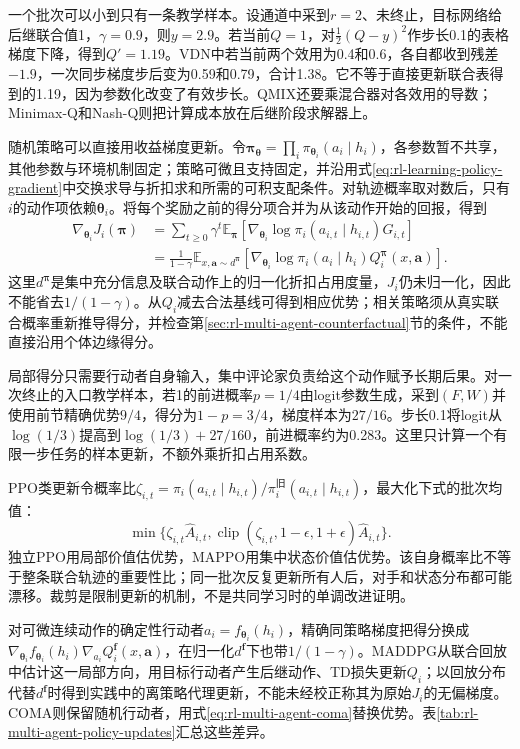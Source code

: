 一个批次可以小到只有一条教学样本。设通道中采到$r=2$、未终止，目标网络给后继联合值1，$\gamma=0.9$，则$y=2.9$。若当前$Q=1$，对$\tfrac12(Q-y)^2$作步长0.1的表格梯度下降，得到$Q'=1.19$。VDN中若当前两个效用为0.4和0.6，各自都收到残差$-1.9$，一次同步梯度步后变为0.59和0.79，合计1.38。它不等于直接更新联合表得到的1.19，因为参数化改变了有效步长。QMIX还要乘混合器对各效用的导数；Minimax-Q和Nash-Q则把计算成本放在后继阶段求解器上。

随机策略可以直接用收益梯度更新。令$\bm\pi_{\bm\theta}=\prod_i\pi_{\bm\theta_i}(a_i\mid h_i)$，各参数暂不共享，其他参数与环境机制固定；策略可微且支持固定，并沿用式\eqref{eq:rl-learning-policy-gradient}中交换求导与折扣求和所需的可积支配条件。对轨迹概率取对数后，只有$i$的动作项依赖$\bm\theta_i$。将每个奖励之前的得分项合并为从该动作开始的回报，得到
\begin{align}
 \nabla_{\bm\theta_i}J_i(\bm\pi)
 &=\sum_{t\geq0}\gamma^t
   \mathbb E_{\bm\pi}
   [\nabla_{\bm\theta_i}\log\pi_i(a_{i,t}\mid h_{i,t})G_{i,t}]
 \nonumber\\
 &=\frac{1}{1-\gamma}
   \mathbb E_{x,\bm a\sim d^{\bm\pi}}
   [\nabla_{\bm\theta_i}\log\pi_i(a_i\mid h_i)
           Q_i^{\bm\pi}(x,\bm a)].
 \label{eq:rl-multi-agent-policy-gradient}
\end{align}
这里$d^{\bm\pi}$是集中充分信息及联合动作上的归一化折扣占用度量，$J_i$仍未归一化，因此不能省去$1/(1-\gamma)$。从$Q_i$减去合法基线可得到相应优势；相关策略须从真实联合概率重新推导得分，并检查第\ref{sec:rl-multi-agent-counterfactual}节的条件，不能直接沿用个体边缘得分。

局部得分只需要行动者自身输入，集中评论家负责给这个动作赋予长期后果。对一次终止的入口教学样本，若1的前进概率$p=1/4$由logit参数生成，采到$(F,W)$并使用前节精确优势$9/4$，得分为$1-p=3/4$，梯度样本为$27/16$。步长0.1将logit从$\log(1/3)$提高到$\log(1/3)+27/160$，前进概率约为0.283。这里只计算一个有限一步任务的样本更新，不额外乘折扣占用系数。

PPO类更新令概率比$\zeta_{i,t}=\pi_i(a_{i,t}\mid h_{i,t})/
\pi_i^{\text{旧}}(a_{i,t}\mid h_{i,t})$，最大化下式的批次均值：
\[
 \min\{\zeta_{i,t}\widehat A_{i,t},
       \operatorname{clip}(\zeta_{i,t},1-\epsilon,1+\epsilon)
                      \widehat A_{i,t}\}.
\]
独立PPO用局部价值估优势，MAPPO用集中状态价值估优势。该自身概率比不等于整条联合轨迹的重要性比；同一批次反复更新所有人后，对手和状态分布都可能漂移。裁剪是限制更新的机制，不是共同学习时的单调改进证明。

对可微连续动作的确定性行动者$a_i=f_{\bm\theta_i}(h_i)$，精确同策略梯度把得分换成
$\nabla_{\bm\theta_i}f_{\bm\theta_i}(h_i)\nabla_{a_i}Q_i^{\bm f}(x,\bm a)$，在归一化$d^{\bm f}$下也带$1/(1-\gamma)$。MADDPG从联合回放中估计这一局部方向，用目标行动者产生后继动作、TD损失更新$Q_i$；以回放分布代替$d^{\bm f}$时得到实践中的离策略代理更新，不能未经校正称其为原始$J_i$的无偏梯度。COMA则保留随机行动者，用式\eqref{eq:rl-multi-agent-coma}替换优势。表\ref{tab:rl-multi-agent-policy-updates}汇总这些差异。

